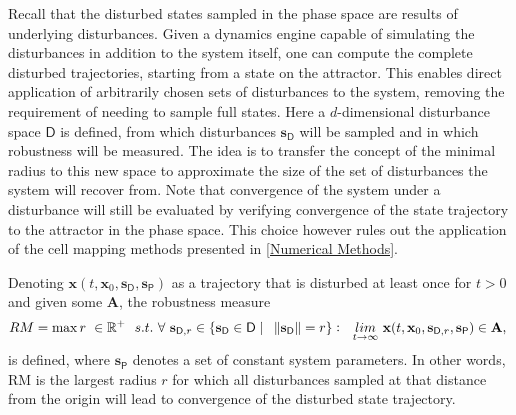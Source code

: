     Recall that the disturbed states sampled in the phase space are results of underlying disturbances. Given a dynamics engine capable of simulating the disturbances in addition to the system itself, one can compute the complete disturbed trajectories, starting from a state on the attractor. This enables direct application of arbitrarily chosen sets of disturbances to the system, removing the requirement of needing to sample full states. Here a $d$-dimensional disturbance space $\mathsf{D}$ is defined, from which disturbances $\mathbf{s}_{\mathsf{D}}$ will be sampled and in which robustness will be measured. The idea is to transfer the concept of the minimal radius to this new space to approximate the size of the set of disturbances the system will recover from. Note that convergence of the system under a disturbance will still be evaluated by verifying convergence of the state trajectory to the attractor in the phase space. This choice however rules out the application of the cell mapping methods presented in \ref{Numerical Methods}. 

    Denoting $\mathbf{x}(t,\mathbf{x}_0,\mathbf{s}_{\mathsf{D}},\mathbf{s}_{\mathsf{P}})$ as a trajectory that is disturbed at least once for $t > 0$ and given some $\mathbf{A}$, the robustness measure
    \begin{gather} \label{eq:8}
        RM = \max r\ \in \mathbb{R}^+ \ \ s.t.\ \forall\ \mathbf{s}_{\mathsf{D},r} \in \{\mathbf{s}_{\mathsf{D}} \in \mathsf{D} \mid\ \ \norm{\mathbf{s}_{\mathsf{D}}} = r\}:\ \ \underset{t \rightarrow \infty}{lim} \ \mathbf{x}(t,\mathbf{x}_0,\mathbf{s}_{\mathsf{D},r},\mathbf{s}_{\mathsf{P}}) \in \mathbf{A},\
    \end{gather}
    is defined, where $\mathbf{s}_{\mathsf{P}}$ denotes a set of constant system parameters.
    In other words, RM is the largest radius $r$ for which all disturbances sampled at that distance from the origin will lead to convergence of the disturbed state trajectory.

